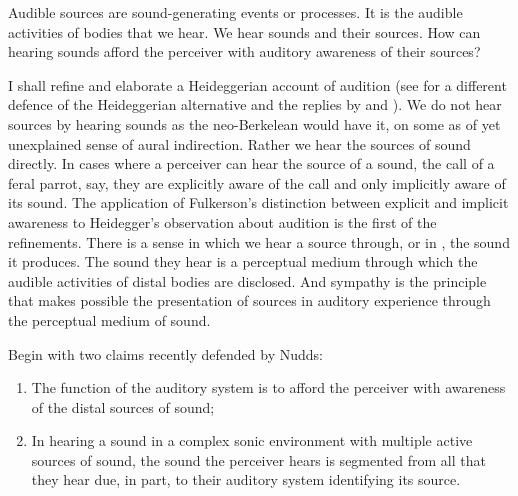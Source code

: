 Audible sources are sound-generating events or processes. It is the audible activities of bodies that we hear. We hear sounds and their sources. How can hearing sounds afford the perceiver with auditory awareness of their sources?

I shall refine and elaborate a Heideggerian account of audition (see \citealt{Leddington:2014aa} for a different defence of the Heideggerian alternative and the replies by \citealt{OCallaghan:2014aa} and \citealt{Nudds:2014aa}). We do not hear sources by hearing sounds as the neo-Berkelean would have it, on some as of yet unexplained sense of aural indirection. Rather we hear the sources of sound directly. In cases where a perceiver can hear the source of a sound, the call of a feral parrot, say, they are explicitly aware of the call and only implicitly aware of its sound. The application of Fulkerson's \citeyearpar{Fulkerson:2014ek} distinction between explicit and implicit awareness to Heidegger's \citeyearpar{Heidegger:1935uq} observation about audition is the first of the refinements. There is a sense in which we hear a source through, or in \citep{Leddington:2014aa}, the sound it produces. The sound they hear is a perceptual medium through which the audible activities of distal bodies are disclosed. And sympathy is the principle that makes possible the presentation of sources in auditory experience through the perceptual medium of sound.  


Begin with two claims recently defended by Nudds:
\begin{enumerate}[(1)]
	\item The function of the auditory system is to afford the perceiver with awareness of the distal sources of sound;
	\item In hearing a sound in a complex sonic environment with multiple active sources of sound, the sound the perceiver hears is segmented from all that they hear due, in part, to their auditory system identifying its source.
\end{enumerate}

